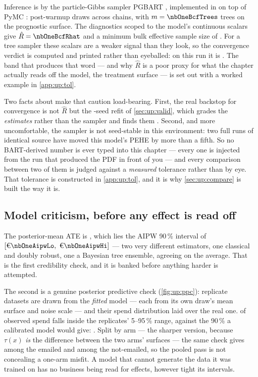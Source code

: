 Inference is by the particle-Gibbs sampler PGBART \citep{quiroga2022}, implemented in
 on top of PyMC \citep{salvatier2016}: \nbOneBcfDraws{}
post-warmup draws across \nbOneBcfChains{} chains, with $m = \nbOneBcfTrees$ trees on the
prognostic surface. The diagnostics scoped to the model's continuous scalars give
$\hat R = \nbOneBcfRhat$ and a minimum bulk effective sample size of \nbOneBcfEss{}
\citep{vehtari2021}. For a tree sampler these scalars are a weaker signal than they look, so the
convergence verdict is computed and printed rather than eyeballed: on this run it is
\textbf{\nbOneBcfRhatVerdict}. The band that produces that word --- and why $\hat R$ is a poor proxy
for what the chapter actually reads off the model, the treatment surface --- is set out with a
worked example in \cref{app:up:tol}.

Two facts about  make that caution load-bearing. First, the real backstop for
convergence is not $\hat R$ but the \nbOneNSeeds-seed refit of \cref{sec:up:valid}, which grades the
\emph{estimates} rather than the sampler and finds them \nbOneStabVerdict. Second, and more
uncomfortable, the sampler is not seed-stable in this environment: two full runs of identical source
have moved this model's PEHE by more than a fifth. So no BART-derived number is ever typed into this
chapter --- every one is injected from the run that produced the PDF in front of you --- and every
comparison between two of them is judged against a \emph{measured} tolerance rather than by eye. That
tolerance is constructed in \cref{app:up:tol}, and it is why \cref{sec:up:compare} is built the way
it is.

\subsection*{Model criticism, before any effect is read off}

The posterior-mean ATE is \eur{\nbOneBcfAte}, which lies \nbOneBcfAgrees{} the AIPW 90\,\%
interval of $[\eur{\nbOneAipwLo},\ \eur{\nbOneAipwHi}]$ --- two very different estimators, one
classical and doubly robust, one a Bayesian tree ensemble, agreeing on the average. That is the first credibility check, and it is banked before anything harder is
attempted.

The second is a genuine posterior predictive check (\cref{fig:up:ppc}): replicate datasets are
drawn from the \emph{fitted} model --- each from its own draw's mean surface and noise scale ---
and their spend distribution laid over the real one. \pc{\nbOnePpcCov} of observed spend falls
inside the replicates' 5--95\,\% range, against the 90\,\% a calibrated model would give:
\nbOnePpcVerdict. Split by arm --- the sharper version, because $\tau(x)$ \emph{is} the difference
between the two arms' surfaces --- the same check gives \pc{\nbOnePpcCovTreated} among the emailed
and \pc{\nbOnePpcCovControl} among the not-emailed, so the pooled pass is not concealing a one-arm
misfit. A model that cannot generate the data it was trained on has no business being read for
effects, however tight its intervals.

